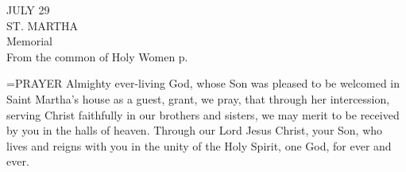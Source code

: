 \begin{center}\normalsize JULY 29\\
\footnotesize ST. MARTHA\\
\footnotesize Memorial\\
\footnotesize From the common of Holy Women p. \\
\end{center}

\hangindent=\parindent \small{PRAYER 
Almighty ever-living God,
whose Son was pleased to be welcomed
in Saint Martha’s house as a guest,
grant, we pray,
that through her intercession,
serving Christ faithfully in our brothers and sisters,
we may merit to be received by you
in the halls of heaven.
Through our Lord Jesus Christ, your Son,
who lives and reigns with you in the unity of the Holy Spirit,
one God, for ever and ever.\\}
 
